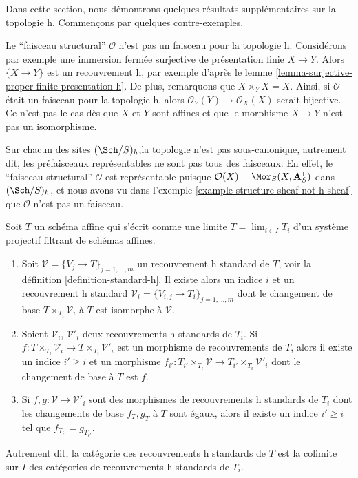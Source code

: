 \noindent
Dans cette section, nous démontrons quelques résultats supplémentaires sur la topologie h.
Commençons par quelques contre-exemples.

\begin{example}
\label{example-structure-sheaf-not-h-sheaf}
Le ``faisceau structural'' $\mathcal{O}$ n'est pas un faisceau pour la topologie h.
Considérons par exemple une immersion fermée surjective de
présentation finie $X \to Y$. Alors $\{X \to Y\}$ est un recouvrement h,
par exemple d'après le lemme \ref{lemma-surjective-proper-finite-presentation-h}.
De plus, remarquons que $X \times_Y X = X$.
Ainsi, si $\mathcal{O}$ était un faisceau pour la topologie h, alors
$\mathcal{O}_Y(Y) \to \mathcal{O}_X(X)$ serait bijective.
Ce n'est pas le cas dès que $X$ et $Y$ sont affines et que le morphisme
$X \to Y$ n'est pas un isomorphisme.
\end{example}

\begin{example}
\label{example-representable-sheaf-not-h-sheaf}
Sur chacun des sites $(\Sch/S)_h$,\newline la topologie n'est pas sous-canonique,
autrement dit, les préfaisceaux représentables ne sont pas tous des faisceaux.
En effet, le ``faisceau structural'' $\mathcal{O}$ est représentable
puisque $\mathcal{O}(X) = \Mor_S(X, \mathbf{A}^1_S)$
dans $(\Sch/S)_h$, et nous avons vu dans
l'exemple \ref{example-structure-sheaf-not-h-sheaf}
que $\mathcal{O}$ n'est pas un faisceau.
\end{example}

\begin{lemma}
\label{lemma-limit-h-topology}
Soit $T$ un schéma affine qui s'écrit comme une limite
$T = \lim_{i \in I} T_i$ d'un système projectif filtrant de schémas affines.
\begin{enumerate}
\item Soit $\mathcal{V} = \{V_j \to T\}_{j = 1, \ldots, m}$ un
recouvrement h standard de $T$, voir la définition
\ref{definition-standard-h}.
Il existe alors un indice $i$ et un recouvrement h standard
$\mathcal{V}_i = \{V_{i, j} \to T_i\}_{j = 1, \ldots, m}$
dont le changement de base $T \times_{T_i} \mathcal{V}_i$ à $T$
est isomorphe à $\mathcal{V}$.
\item Soient $\mathcal{V}_i$, $\mathcal{V}'_i$ deux recouvrements h standards
de $T_i$. Si
$f : T \times_{T_i} \mathcal{V}_i \to T \times_{T_i} \mathcal{V}'_i$ est
un morphisme de recouvrements de $T$, alors il existe un indice
$i' \geq i$ et un morphisme
$f_{i'} : T_{i'} \times_{T_i} \mathcal{V} \to
T_{i'} \times_{T_i} \mathcal{V}'_i$
dont le changement de base à $T$ est $f$.
\item Si
$f, g : \mathcal{V} \to \mathcal{V}'_i$
sont des morphismes de recouvrements h standards de $T_i$ dont les
changements de base $f_T, g_T$ à $T$ sont égaux, alors il existe un
indice $i' \geq i$ tel que $f_{T_{i'}} = g_{T_{i'}}$.
\end{enumerate}
Autrement dit, la catégorie des recouvrements h standards de $T$ est
la colimite sur $I$ des catégories de recouvrements h standards de $T_i$.
\end{lemma}

